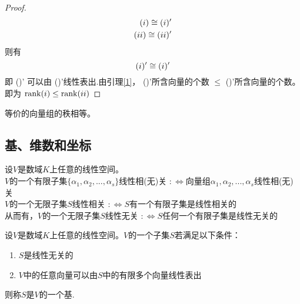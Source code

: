 \documentclass[blue,normal,cn]{elegantnote}
\begin{document}
\begin{theorem}
\begin{proof}
    \begin{equation*}
        \begin{aligned}
            (\uppercase\expandafter{\romannumeral1})\cong (\uppercase\expandafter{\romannumeral1})'\\
            (\uppercase\expandafter{\romannumeral2}) \cong (\uppercase\expandafter{\romannumeral2})'
        \end{aligned}
    \end{equation*}
    则有
    \begin{equation*}
        (\uppercase\expandafter{\romannumeral1})'\cong (\uppercase\expandafter{\romannumeral1})'\\
    \end{equation*}
    即 (\uppercase\expandafter{})' 可以由  (\uppercase\expandafter{})'线性表出.由引理\ref{1}，  (\uppercase\expandafter{})'所含向量的个数 $\leq$ (\uppercase\expandafter{})'所含向量的个数。即为
    $\mathrm{rank}(\uppercase\expandafter{\romannumeral1}) \leq \mathrm{rank}(\uppercase\expandafter{\romannumeral2})$
\end{proof}

\begin{corollary}
    \label{4}
等价的向量组的秩相等。
\end{corollary}




 \subsection{基、维数和坐标}

\begin{definition}
    设$V$是数域$K$上任意的线性空间。\\
    $V$的一个有限子集$\{α_1,α_2,...,α_s\}$线性相(无)关
    $:\Leftrightarrow$向量组$α_1,α_2,...,α_s$线性相(无)关\\
    $V$的一个无限子集$S$线性相关
    $:\Leftrightarrow S$有一个有限子集是线性相关的\\
    从而有，$V$的一个无限子集$S$线性无关 $:\Leftrightarrow S$任何一个有限子集是线性无关的
\end{definition}

\begin{definition}
    设$V$是数域$K$上任意的线性空间。$V$的一个子集$S$若满足以下条件：
    \begin{enumerate}
        \item $S$是线性无关的
        \item $V$中的任意向量可以由$S$中的有限多个向量线性表出
    \end{enumerate}
    则称$S$是$V$的一个基.
\end{definition}


\end{theorem}
\end{document}
